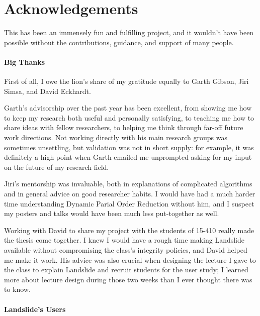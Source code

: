 \chapter*{Acknowledgements}

This has been an immensely fun and fulfilling project, and it wouldn't have been possible without the contributions, guidance, and support of many people.

\subsubsection{Big Thanks}

First of all, I owe the lion's share of my gratitude equally to Garth Gibson, Jiri Simsa, and David Eckhardt.

Garth's advisorship over the past year has been excellent, from showing me how to keep my research both useful and personally satisfying, to teaching me how to share ideas with fellow researchers, to helping me think through far-off future work directions. Not working directly with his main research groups was sometimes unsettling, but validation was not in short supply: for example, it was definitely a high point when Garth emailed me unprompted asking for my input on the future of my research field.

Jiri's mentorship was invaluable, both in explanations of complicated algorithms and in general advice on good researcher habits. I would have had a much harder time understanding Dynamic Parial Order Reduction without him, and I suspect my posters and talks would have been much less put-together as well.

Working with David to share my project with the students of 15-410 really made the thesis come together. I knew I would have a rough time making Landslide available without compromising the class's integrity policies, and David helped me make it work. His advice was also crucial when designing the lecture I gave to the class to explain Landslide and recruit students for the user study; I learned more about lecture design during those two weeks than I ever thought there was to know.

\subsubsection{Landslide's Users}


